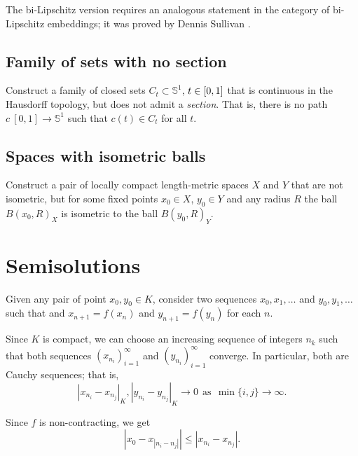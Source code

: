The  bi-Lipschitz version requires 
an analogous statement in the category of bi-Lipschitz embeddings;
it was proved by
Dennis Sullivan \cite[see][]{sullivan}.

\subsection*{Family of sets with no section\easy}
\label{hausdorff-section} 

\begin{pr}
Construct a family of closed sets $C_t\subset\mathbb{S}^1$, $t\z\in [0,1]$ that is continuous in the Hausdorff topology, 
but does not admit a {}\emph{section}.
That is, there is no path $c\:[0,1]\to \mathbb{S}^1$ such that $c(t)\in C_t$ for all $t$.
\end{pr}

\subsection*{Spaces with isometric balls}

\begin{pr}
Construct a pair of locally compact length-metric spaces $X$ and $Y$ 
that are not isometric,
but for some fixed points $x_0\in X$,  $y_0\in Y$ and any radius $R$
the ball $B(x_0,R)_X$ is 
isometric to the ball $B(y_0,R)_Y$.
\end{pr}



\section*{Semisolutions}



Given any pair of point $x_0,y_0\in K$, 
consider two sequences $x_0,x_1,\dots$ and $y_0,y_1,\dots$
such that 
and $x_{n+1}=f(x_n)$ and $y_{n+1}=f(y_n)$ for each $n$.

Since $K$ is compact, 
we can choose an increasing sequence of integers $n_k$
such that both sequences $(x_{n_i})_{i=1}^\infty$ and $(y_{n_i})_{i=1}^\infty$
converge.
In particular, both are Cauchy sequences;
that is,
\[
|x_{n_i}-x_{n_j}|_K, |y_{n_i}-y_{n_j}|_K\to 0
\ \ 
\text{as}
\ \ \min\{i,j\}\to\infty.
\]


Since $f$ is non-contracting, we get
\[
|x_0-x_{|n_i-n_j|}|
\le 
|x_{n_i}-x_{n_j}|.
\]

